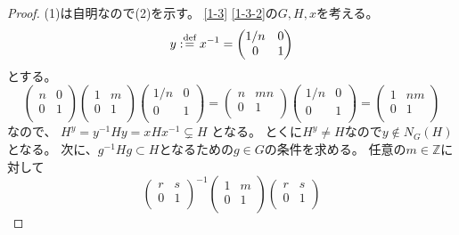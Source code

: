 \documentclass[uplatex]{jsreport}
\theoremstyle{definition}
\newcommand{\dfn}{:\overset{\mbox{{\scriptsize def}}}{=}}
\newcommand{\Z}{\mathbb{Z}}
\begin{document}
\begin{proof}
  (1)は自明なので(2)を示す。
  \autoref{1-3} \ref{1-3-2}の\(G,H,x\)を考える。
  \[
  y\dfn x^{-1} =
  \begin{pmatrix}
    1/n & 0 \\
    0 & 1 \\
  \end{pmatrix}
  \]
  とする。
  \[
  \begin{pmatrix}
    n & 0 \\
    0 & 1 \\
  \end{pmatrix}
  \begin{pmatrix}
    1 & m \\
    0 & 1 \\
  \end{pmatrix}
  \begin{pmatrix}
    1/n & 0 \\
    0 & 1 \\
  \end{pmatrix}
  =
  \begin{pmatrix}
    n & mn \\
    0 & 1 \\
  \end{pmatrix}
  \begin{pmatrix}
    1/n & 0 \\
    0 & 1 \\
  \end{pmatrix}
  =
  \begin{pmatrix}
    1 & nm \\
    0 & 1 \\
  \end{pmatrix}
  \]
  なので、
  \(H^y = y^{-1}Hy = xHx^{-1}\subsetneq H\)
  となる。
  とくに\(H^y\neq H\)なので\(y\not\in N_G(H)\)となる。
  次に、\(g^{-1}Hg\subset H\)となるための\(g\in G\)の条件を求める。
  任意の\(m\in \Z\)に対して
  \[
  \begin{pmatrix}
    r & s \\
    0 & 1 \\
  \end{pmatrix}^{-1}
  \begin{pmatrix}
    1 & m \\
    0 & 1 \\
  \end{pmatrix}
  \begin{pmatrix}
    r & s \\
    0 & 1 \\
  \end{pmatrix}
\]
\end{proof}
\end{document}
